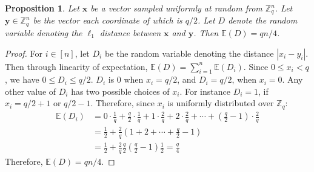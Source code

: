 \documentclass[pdflatex,sn-mathphys-num]{sn-jnl}
\newtheorem{proposition}{Proposition}
\theoremstyle{definition}
\newcommand{\vtr}[1]{\mathbf{#1}}
\begin{document}
\begin{proposition}
\label{prop:exp-distance}
Let $\vtr{x}$ be a vector sampled uniformly at random from $\mathbb{Z}_q^n$. Let $\vtr{y} \in \mathbb{Z}_q^n$ be the vector each coordinate of which is $q/2$. Let $D$ denote the random variable denoting the $\ell_1$ distance between $\vtr{x}$ and $\vtr{y}$. Then $\mathbb{E}(D) = qn/4$.
\end{proposition}
\begin{proof}
For $i \in [n]$, let $D_i$ be the random variable denoting the distance $|x_i - y_i|$. Then through linearity of expectation, $\mathbb{E}(D) = \sum_{i=1}^n \mathbb{E}(D_i)$. Since $0 \leq x_i < q$, we have $0 \leq D_i \leq q/2$. $D_i$ is 0 when $x_i = q/2$, and $D_i = q/2$, when $x_i = 0$. Any other value of $D_i$ has two possible choices of $x_i$. For instance $D_i = 1$, if $x_i = q/2 + 1$ or $q/2 - 1$. Therefore, since $x_i$ is uniformly distributed over $\mathbb{Z}_q$:
\begin{align*}
    \mathbb{E}(D_i) &= 0\cdot \frac{1}{q} + \frac{q}{2}\cdot \frac{1}{q} + 1 \cdot \frac{2}{q} + 2  \cdot \frac{2}{q} + \cdots +  \left( \frac{q}{2} - 1 \right)\cdot \frac{2}{q}\\
    &= \frac{1}{2} + \frac{2}{q} \left(1 + 2 + \cdots + \frac{q}{2} - 1\right)\\
    &= \frac{1}{2} + \frac{2}{q}  \frac{q}{2} \left(\frac{q}{2} - 1\right) \frac{1}{2} = \frac{q}{4}
\end{align*}
Therefore, $\mathbb{E}(D) = qn/4$. 
\end{proof}
\end{document}
